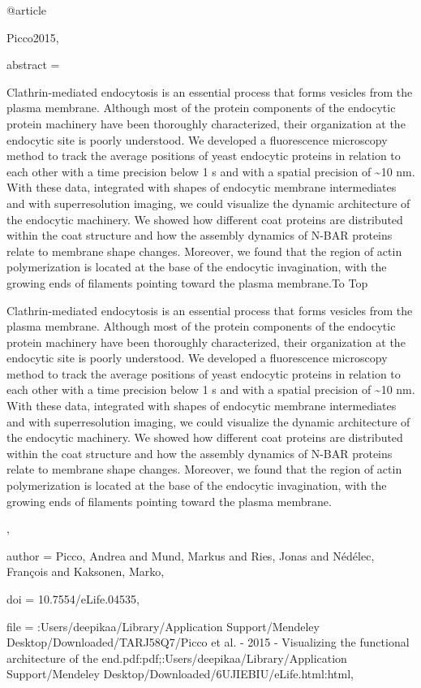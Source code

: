 @article{Picco2015,

abstract = {Clathrin-mediated endocytosis is an essential process that forms vesicles from the plasma membrane. Although most of the protein components of the endocytic protein machinery have been thoroughly characterized, their organization at the endocytic site is poorly understood. We developed a fluorescence microscopy method to track the average positions of yeast endocytic proteins in relation to each other with a time precision below 1 s and with a spatial precision of {\~{}}10 nm. With these data, integrated with shapes of endocytic membrane intermediates and with superresolution imaging, we could visualize the dynamic architecture of the endocytic machinery. We showed how different coat proteins are distributed within the coat structure and how the assembly dynamics of N-BAR proteins relate to membrane shape changes. Moreover, we found that the region of actin polymerization is located at the base of the endocytic invagination, with the growing ends of filaments pointing toward the plasma membrane.To Top

Clathrin-mediated endocytosis is an essential process that forms vesicles from the plasma membrane. Although most of the protein components of the endocytic protein machinery have been thoroughly characterized, their organization at the endocytic site is poorly understood. We developed a fluorescence microscopy method to track the average positions of yeast endocytic proteins in relation to each other with a time precision below 1 s and with a spatial precision of {\~{}}10 nm. With these data, integrated with shapes of endocytic membrane intermediates and with superresolution imaging, we could visualize the dynamic architecture of the endocytic machinery. We showed how different coat proteins are distributed within the coat structure and how the assembly dynamics of N-BAR proteins relate to membrane shape changes. Moreover, we found that the region of actin polymerization is located at the base of the endocytic invagination, with the growing ends of filaments pointing toward the plasma membrane.},

author = {Picco, Andrea and Mund, Markus and Ries, Jonas and N{\'{e}}d{\'{e}}lec, Fran{\c{c}}ois and Kaksonen, Marko},

doi = {10.7554/eLife.04535},

file = {:Users/deepikaa/Library/Application Support/Mendeley Desktop/Downloaded/TARJ58Q7/Picco et al. - 2015 - Visualizing the functional architecture of the end.pdf:pdf;:Users/deepikaa/Library/Application Support/Mendeley Desktop/Downloaded/6UJIEBIU/eLife.html:html},

}
